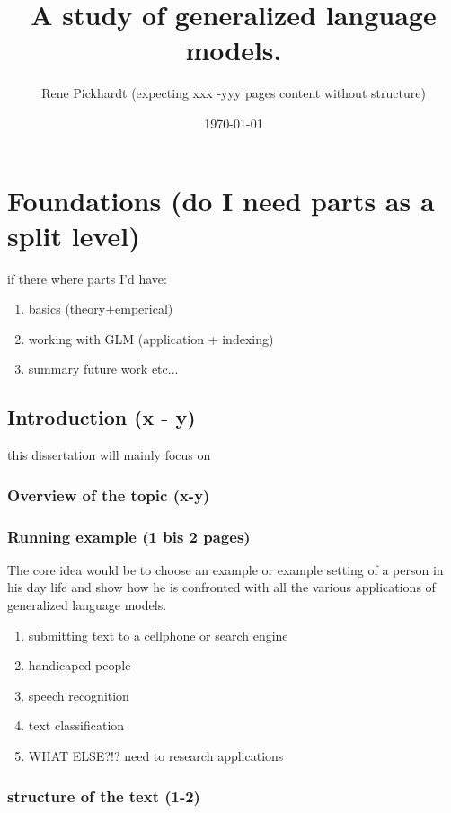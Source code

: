 \documentclass[•]{book}
\title{A study of generalized language models.}
\author{Rene Pickhardt (expecting xxx -yyy pages content without structure)}
\date{\today}
\begin{document}
\maketitle
\tableofcontents

\part{Foundations (do I need parts as a split level)}
if there where parts I'd have:
\begin{enumerate}
\item basics (theory+emperical)
\item working with GLM (application + indexing)
\item summary future work etc...
\end{enumerate}
\chapter{Introduction (x - y)}
this dissertation will mainly focus on \cite{own:typology:2013}
\section{Overview of the topic (x-y)}

\section{Running example (1 bis 2 pages)}
The core idea would be to choose an example or example setting of a person in his day life and show how he is confronted with all the various applications of generalized language models.
\begin{enumerate}
\item submitting text to a cellphone or search engine
\item handicaped people
\item speech recognition
\item text classification
\item WHAT ELSE?!? need to research applications
\end{enumerate}

\section{structure of the text (1-2)}
\end{document}
